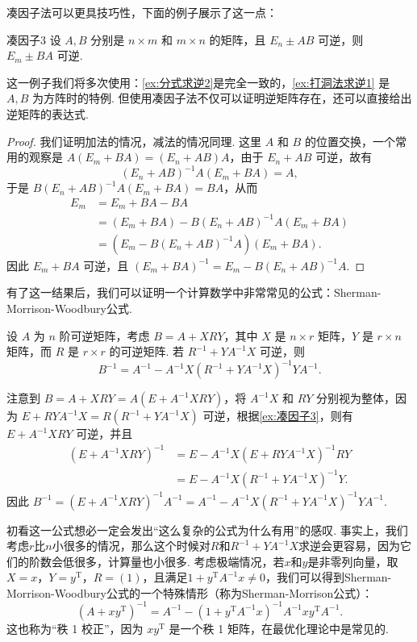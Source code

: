 凑因子法可以更具技巧性，下面的例子展示了这一点：

\begin{example}{}{凑因子3}
    设 $A, B$ 分别是 $n \times m$ 和 $m \times n$ 的矩阵，且 $E_n \pm AB$ 可逆，则 $E_m \pm BA$ 可逆.
\end{example}

这一例子我们将多次使用：\autoref{ex:分式求逆2}是完全一致的，\autoref{ex:打洞法求逆1} 是 $A,B$ 为方阵时的特例. 但使用凑因子法不仅可以证明逆矩阵存在，还可以直接给出逆矩阵的表达式.

\begin{proof}
    我们证明加法的情况，减法的情况同理. 这里 $A$ 和 $B$ 的位置交换，一个常用的观察是 $A(E_m + BA) = (E_n + AB)A$，由于 $E_n + AB$ 可逆，故有
    \[(E_n + AB)^{-1}A(E_m + BA) = A,\]
    于是 $B(E_n + AB)^{-1}A(E_m + BA) = BA$，从而
    \begin{align*}
        E_m &= E_m + BA - BA \\
           & = (E_m + BA) - B(E_n + AB)^{-1}A(E_m + BA) \\
           & = (E_m - B(E_n + AB)^{-1}A)(E_m + BA).
    \end{align*}
    因此 $E_m + BA$ 可逆，且 $(E_m + BA)^{-1} = E_m - B(E_n + AB)^{-1}A$.
\end{proof}

有了这一结果后，我们可以证明一个计算数学中非常常见的公式：Sherman-Morrison-Woodbury公式.
\begin{example}{}{}
    设 $A$ 为 $n$ 阶可逆矩阵，考虑 $B = A + XRY$，其中 $X$ 是 $n \times r$ 矩阵，$Y$ 是 $r \times n$ 矩阵，而 $R$ 是 $r \times r$ 的可逆矩阵. 若 $R^{-1} + YA^{-1}X$ 可逆，则
    \[B^{-1}=A^{-1}-A^{-1}X(R^{-1}+YA^{-1}X)^{-1}YA^{-1}.\]
\end{example}

\begin{solution}
    注意到 $B = A + XRY = A(E + A^{-1}XRY)$，将 $A^{-1}X$ 和 $RY$ 分别视为整体，因为 $E + RYA^{-1}X = R(R^{-1} + YA^{-1}X)$ 可逆，根据\autoref{ex:凑因子3}，则有 $E + A^{-1}XRY$ 可逆，并且
    \begin{align*}
        (E + A^{-1}XRY)^{-1} & = E - A^{-1}X(E + RYA^{-1}X)^{-1}RY \\
                             & = E - A^{-1}X(R^{-1} + YA^{-1}X)^{-1}Y.
    \end{align*}
    因此 $B^{-1} = (E + A^{-1}XRY)^{-1}A^{-1} = A^{-1} - A^{-1}X(R^{-1} + YA^{-1}X)^{-1}YA^{-1}$.
\end{solution}

初看这一公式想必一定会发出``这么复杂的公式为什么有用''的感叹. 事实上，我们考虑$r$比$n$小很多的情况，那么这个时候对$R$和$R^{-1}+YA^{-1}X$求逆会更容易，因为它们的阶数会低很多，计算量也小很多. 考虑极端情况，若$x$和$y$是非零列向量，取$X=x$，$Y=y^\mathrm{T}$，$R=(1)$，且满足$1+y^\mathrm{T}A^{-1}x\neq 0$，我们可以得到Sherman-Morrison-Woodbury公式的一个特殊情形（称为Sherman-Morrison公式）：
\[(A+xy^\mathrm{T})^{-1}=A^{-1}-(1+y^\mathrm{T}A^{-1}x)^{-1}A^{-1}xy^\mathrm{T}A^{-1}.\]
这也称为``秩 1 校正''，因为 $xy^\mathrm{T}$ 是一个秩 1 矩阵，在最优化理论中是常见的.


